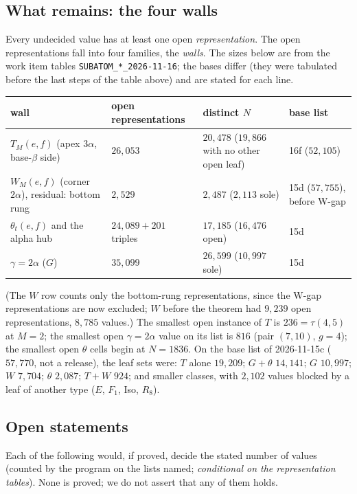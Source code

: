 \documentclass[11pt,reqno]{amsart}
\theoremstyle{plain}
\theoremstyle{definition}
\newcommand{\rec}[1]{\textup{\texttt{#1}}}
\begin{document}
\subsection{What remains: the four walls}\label{sub:cen:walls}
Every undecided value has at least one open \emph{representation}. The open representations fall into four families,
the \emph{walls}. The sizes below are from the work item tables \rec{SUBATOM\_*\_2026-11-16}; the bases differ (they were
tabulated before the last steps of the table above) and are stated for each line.
\begin{center}
\begin{tabular}{p{4.3cm}p{2.2cm}p{4.2cm}p{2.6cm}}
\hline
wall & open representations & distinct $N$ & base list\\\hline
$T_M(e,f)$ (apex $3\alpha$, base-$\beta$ side) & $26{,}053$ & $20{,}478$ ($19{,}866$ with no other open leaf) & 16f ($52{,}105$)\\
$W_M(e,f)$ (corner $2\alpha$), residual: bottom rung & $2{,}529$ & $2{,}487$ ($2{,}113$ sole) & 15d ($57{,}755$), before W-gap\\
$\theta_t(e,f)$ and the alpha hub & $24{,}089+201$ triples & $17{,}185$ ($16{,}476$ open) & 15d\\
$\gamma=2\alpha$ ($G$) & $35{,}099$ & $26{,}599$ ($10{,}997$ sole) & 15d\\\hline
\end{tabular}
\end{center}
(The $W$ row counts only the bottom-rung representations, since the W-gap representations are now excluded; $W$ before
the theorem had $9{,}239$ open representations, $8{,}785$ values.) The smallest open instance of $T$ is
$236=\tau(4,5)$ at $M=2$; the smallest open $\gamma=2\alpha$ value on its list is $816$ (pair $(7,10)$, $g=4$); the
smallest open $\theta$ cells begin at $N=1836$. On the base list of 2026-11-15c ($57{,}770$, not a release), the leaf sets
were: $T$ alone $19{,}209$; $G+\theta$ $14{,}141$; $G$ $10{,}997$; $W$ $7{,}704$; $\theta$ $2{,}087$; $T+W$ $924$; and
smaller classes, with $2{,}102$ values blocked by a leaf of another type ($E$, $F_1$, Iso, $R_8$).

\subsection{Open statements}\label{sub:cen:conj}
Each of the following would, if proved, decide the stated number of values (counted by the program on the lists named;
\emph{conditional on the representation tables}). None is proved; we do not assert that any of them holds.
\end{document}
